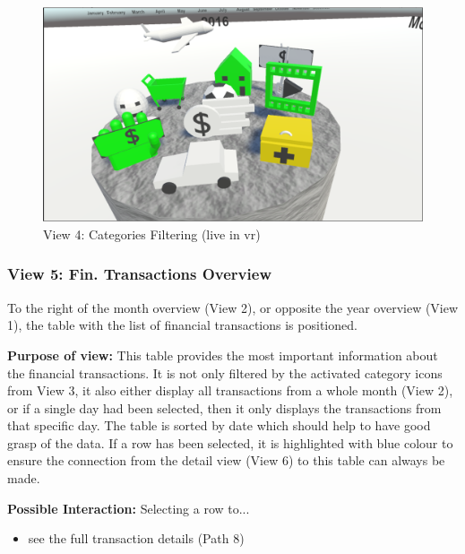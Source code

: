 \begin{figure}[h]
	\begin{center}
		\includegraphics[width=12cm]{03_Figures/08_Development/View4_CategoriesFiltering_Loading.png}
		\caption{View 4: Categories Filtering (live in \gls{vr})}
		\label{fig:unityview4}
	\end{center}
\end{figure}


\subsubsection{View 5: Fin. Transactions Overview}

To the right of the month overview (View 2), or opposite the year overview (View 1), the table with the list of financial transactions is positioned.

\textbf{Purpose of view:} This table provides the most important information about the financial transactions. It is not only filtered by the activated category icons from View 3, it also either display all transactions from a whole month (View 2), or if a single day had been selected, then it only displays the transactions from that specific day. The table is sorted by date which should help to have good grasp of the data. If a row has been selected, it is highlighted with blue colour to ensure the connection from the detail view (View 6) to this table can always be made.

\textbf{Possible Interaction:} Selecting a row to...
\begin{itemize}[noitemsep,nolistsep]
	\item see the full transaction details (Path 8)
\end{itemize}

